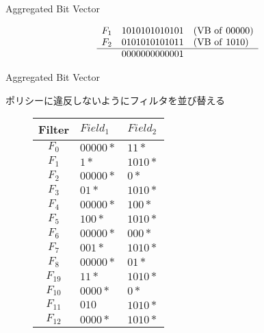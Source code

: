 \documentclass[12pt,dvipdfmx,mathserif,uplatex,aspectratio=32]{beamer}
\makeatletter
\newcommand{\tblcaption}[1]{\def\@captype{table}\caption{#1}}
\makeatother
\begin{document}
\begin{frame}{Aggregated Bit Vector}
\begin{figure}[h]
\begin{minipage}[c]{.55\textwidth}
   \begin{equation*}
    \begin{array}{lll}
     F_{1} & 1010101010101 & ({\rm VB \ of \ } 00000) \\
     F_{2} & 0101010101011 & ({\rm VB \ of \ } 1010) \\ \hline
           & 0000000000001 &
    \end{array}
   \end{equation*}

  \end{minipage}
\end{figure}

\end{frame}


\begin{frame}{Aggregated Bit Vector}

ポリシーに違反しないようにフィルタを並び替える

\begin{figure}[h]
 \def\@captype{table}
 \begin{minipage}[t]{.4\textwidth}
  {\footnotesize
  {\centering
  \begin{tabular}{c|l|l} 
   Filter   & $Field_{1}$ & $Field_{2}$ \\ \hline
   $F_{0} $ & $00000*$    & $11*$   \\ \hline
   $F_{1} $ & $1*$        & $1010*$  \\ \hline
   $F_{2} $ & $00000*$    & $0*$    \\ \hline
   $F_{3} $ & $01*$       & $1010*$  \\ \hline
   $F_{4} $ & $00000*$    & $100*$   \\ \hline
   $F_{5} $ & $100*$      & $1010*$  \\ \hline
   $F_{6} $ & $00000*$    & $000*$  \\ \hline
   $F_{7} $ & $001*$      & $1010*$  \\ \hline
   $F_{8} $ & $00000*$    & $01*$   \\ \hline
   $F_{19} $ & $11*$      & $1010*$  \\ \hline
   $F_{10} $ & $0000*$    & $0*$   \\ \hline
   $F_{11} $ & $010$      & $1010*$  \\ \hline
   $F_{12} $ & $0000*$    & $1010*$   
  \end{tabular}

}}
\end{minipage}
\end{figure}
\end{frame}
\end{document}
